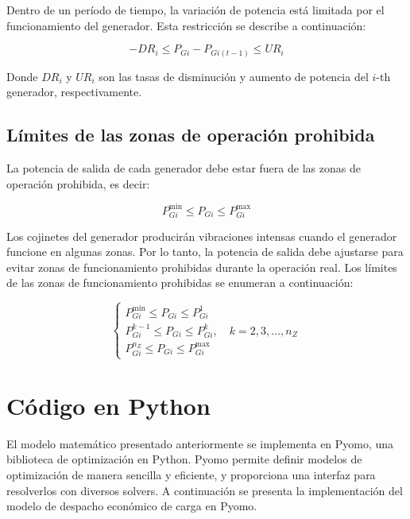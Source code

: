 \documentclass[11pt]{article}
\begin{document}

Dentro de un período de tiempo, la variación de potencia está limitada por el funcionamiento del generador. 
Esta restricción se describe a continuación:

\begin{equation}
    - DR_{i} \leq  P_{Gi} - P_{Gi(t-1)} \leq UR_{i}
\end{equation}

Donde \( DR_{i} \) y \( UR_{i} \) son las tasas de disminución y aumento de potencia del \( i \)-th generador,
respectivamente.

\subsection{Límites de las zonas de operación prohibida}

La potencia de salida de cada generador debe estar fuera de las zonas de operación prohibida, es decir:

\begin{equation}
    P_{Gi}^{\min} \leq P_{Gi} \leq P_{Gi}^{\max}
\end{equation}

Los cojinetes del generador producirán vibraciones intensas cuando el generador funcione en algunas
zonas. Por lo tanto, la potencia de salida debe ajustarse para evitar zonas de funcionamiento prohibidas durante
la operación real. Los límites de las zonas de funcionamiento prohibidas se enumeran a continuación:

\begin{equation}
    \left\{
    \begin{array}{l}
        P_{Gi}^{\min} \leq P_{Gi} \leq P_{Gi}^{1} \\[8pt]
        P_{Gi}^{k-1} \leq P_{Gi} \leq P_{Gi}^{k}, \quad k = 2,3,\dots,n_Z \\[8pt]
        P_{Gi}^{n_Z} \leq P_{Gi} \leq P_{Gi}^{\max}
    \end{array}
    \right.
\end{equation}

\newpage
\section{Código en Python}
El modelo matemático presentado anteriormente se implementa en Pyomo, una biblioteca de optimización en Python. Pyomo permite definir modelos de optimización de manera sencilla y eficiente, y proporciona una interfaz para resolverlos con diversos solvers. A continuación se presenta la implementación del modelo de despacho económico de carga en Pyomo.
\end{document}
